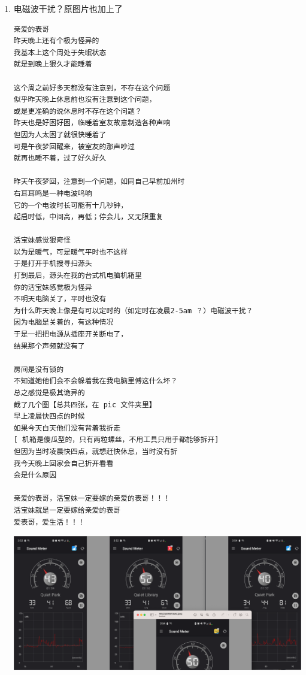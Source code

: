 \documentclass[9pt, b5paper]{article}
\begin{document}
\begin{enumerate}
\begin{verbatim}
以后她再半夜讲电话把别人吵醒
我就去厨房
看她如何再如昨天晚上般撒谎不承认，撒谎不承认她周末讲了多少电话
如同昨天晚上半夜她制造的她房间的巨响一样
我咳嗽了几声，提醒她，我知道她就是故意的
以后与她事事当面对质，看她如何抵赖
对她这样的人的人品，狠无语


如果她一定要半夜讲电话
她不应该是晚上找到学校夜里时时开改有暖气的地方
大声放声自如地讲电话，以尊重别人吗？
她为什么就没有一点儿人品
一定要故意吵别人？

她
说到底，品性太差，
谎话连篇
不值得任何人再信任她

爱表哥，爱生活！！！
活宝妹就是一定要嫁给亲爱的表哥
爱表哥，爱生活！！！

爱表哥，爱生活！！！
活宝妹就是一定要嫁给亲爱的表哥
活宝妹若是还没能嫁给亲爱的表哥
活宝妹就永远守候在亲爱的表哥的身边
爱表哥，爱生活！！！
\end{verbatim}
\item 电磁波干扰？原图片也加上了
\label{sec-3-2-3-6}
\begin{verbatim}
亲爱的表哥
昨天晚上还有个极为怪异的
我基本上这个周处于失眠状态
就是到晚上狠久才能睡着

这个周之前好多天都没有注意到，不存在这个问题
似乎昨天晚上休息前也没有注意到这个问题，
或是更准确的说休息时不存在这个问题？
昨天也是好困好困，临睡着室友故意制造各种声响
但因为人太困了就很快睡着了
可是午夜梦回醒来，被室友的那声吵过
就再也睡不着，过了好久好久

昨天午夜梦回，注意到一个问题，如同自己早前加州时
右耳耳鸣是一种电波呜响
它的一个电波时长可能有十几秒钟，
起启时低，中间高，再低；停会儿，又无限重复

活宝妹感觉狠奇怪
以为是暖气，可是暖气平时也不这样
于是打开手机搜寻扫源头
打到最后，源头在我的台式机电脑机箱里
你的活宝妹感觉极为怪异
不明天电脑关了，平时也没有
为什么昨天晚上像是有可以定时的（如定时在凌晨2-5am ？）电磁波干扰？
因为电脑是关着的，有这种情况
于是一把把电源从插座开关断电了，
结果那个声频就没有了

房间是没有锁的
不知道她他们会不会躲着我在我电脑里傅这什么坏？
总之感觉是极其诡异的
截了几个图【总共四张，在 pic 文件夹里】
早上凌晨快四点的时候
如果今天白天他们没有背着我折走
[ 机箱是傻瓜型的，只有两粒螺丝，不用工具只用手都能够拆开]
但因为当时凌晨快四点，就想赶快休息，当时没有折
我今天晚上回家会自己折开看看
会是什么原因

亲爱的表哥，活宝妹一定要嫁的亲爱的表哥！！！
活宝妹就是一定要嫁给亲爱的表哥
爱表哥，爱生活！！！
\end{verbatim}

\includegraphics[width=.9\linewidth]{./pic/readme_20230307_160440.png}
\end{enumerate}
\end{document}
